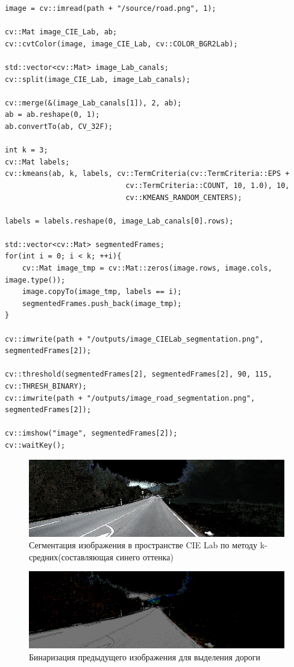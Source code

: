 \begin{lstlisting}[style=cpp_white, caption={Исходный код для сегментации изображения изображения в пространстве CIE Lab по методу k-средних}]
image = cv::imread(path + "/source/road.png", 1);

cv::Mat image_CIE_Lab, ab;
cv::cvtColor(image, image_CIE_Lab, cv::COLOR_BGR2Lab);

std::vector<cv::Mat> image_Lab_canals;
cv::split(image_CIE_Lab, image_Lab_canals);

cv::merge(&(image_Lab_canals[1]), 2, ab);
ab = ab.reshape(0, 1);
ab.convertTo(ab, CV_32F);

int k = 3;
cv::Mat labels;
cv::kmeans(ab, k, labels, cv::TermCriteria(cv::TermCriteria::EPS +
                            cv::TermCriteria::COUNT, 10, 1.0), 10, 
                            cv::KMEANS_RANDOM_CENTERS);

labels = labels.reshape(0, image_Lab_canals[0].rows);

std::vector<cv::Mat> segmentedFrames;
for(int i = 0; i < k; ++i){
    cv::Mat image_tmp = cv::Mat::zeros(image.rows, image.cols, image.type());
    image.copyTo(image_tmp, labels == i);
    segmentedFrames.push_back(image_tmp);
}

cv::imwrite(path + "/outputs/image_CIELab_segmentation.png", segmentedFrames[2]);

cv::threshold(segmentedFrames[2], segmentedFrames[2], 90, 115, cv::THRESH_BINARY);
cv::imwrite(path + "/outputs/image_road_segmentation.png", segmentedFrames[2]);

cv::imshow("image", segmentedFrames[2]);
cv::waitKey();
\end{lstlisting}

\begin{figure}[ht]
    \includegraphics[width=\textwidth]{../outputs/image_CIELab_segmentation.png}
    \caption{Сегментация изображения в пространстве CIE Lab по методу k-средних(составляющая синего оттенка)}
    \label{fig:р}
\end{figure}

\begin{figure}[ht]
    \includegraphics[width=\textwidth]{../outputs/image_road_segmentation.png}
    \caption{Бинаризация предыдущего изображения для выделения дороги}
    \label{fig:р}
\end{figure}

